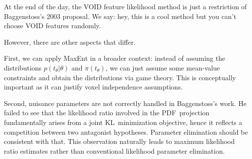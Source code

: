 \documentclass[english]{scrartcl}
\begin{document}
At the end of the day, the VOID feature likelihood method is just a restriction of Baggenstoss's 2003 proposal. We say: hey, this is a cool method but you can't choose VOID features randomly. 

However, there are other aspects that differ.

First, we can apply MaxEnt in a broader context: instead of assuming the distributions $p(t_\theta|\theta)$ and $\pi(t_\theta)$, we can just assume some mean-value constraints and obtain the distributions via game theory. This is conceptually important as it can justify voxel independence assumptions.

Second, nuisance parameters are not correctly handled in Baggenstoss's work. He failed to see that the likelihood ratio involved in the PDF~projection fundamentally arises from a joint KL~minimization objective, hence it reflects a competition between two antagonist hypotheses. Parameter elimination should be consistent with that. This observation naturally leads to maximum likelihood ratio estimates rather than conventional likelihood parameter elimination. 











\end{document}
